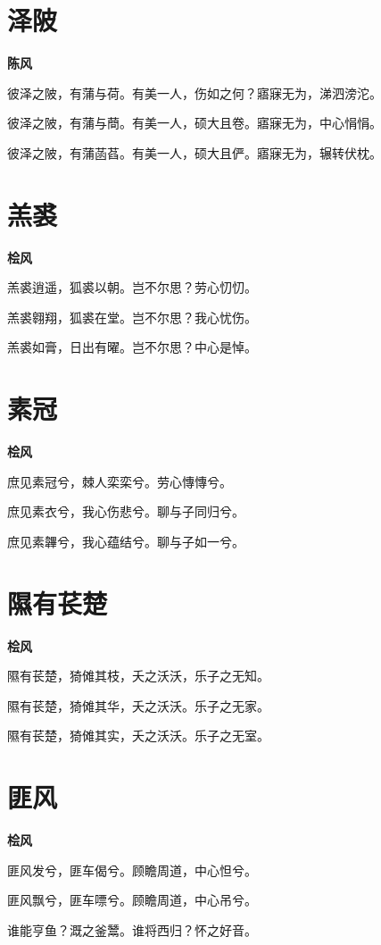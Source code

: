 \documentclass[12pt,a4paper]{ctexbook}
\begin{document}
\section{泽陂}
\textbf{陈风}\par\vspace{0.5em}
彼泽之陂，有蒲与荷。有美一人，伤如之何？寤寐无为，涕泗滂沱。\par
彼泽之陂，有蒲与蕳。有美一人，硕大且卷。寤寐无为，中心悁悁。\par
彼泽之陂，有蒲菡萏。有美一人，硕大且俨。寤寐无为，辗转伏枕。\par

\section{羔裘}
\textbf{桧风}\par\vspace{0.5em}
羔裘逍遥，狐裘以朝。岂不尔思？劳心忉忉。\par
羔裘翱翔，狐裘在堂。岂不尔思？我心忧伤。\par
羔裘如膏，日出有曜。岂不尔思？中心是悼。\par

\section{素冠}
\textbf{桧风}\par\vspace{0.5em}
庶见素冠兮，棘人栾栾兮。劳心慱慱兮。\par
庶见素衣兮，我心伤悲兮。聊与子同归兮。\par
庶见素韠兮，我心蕴结兮。聊与子如一兮。\par

\section{隰有苌楚}
\textbf{桧风}\par\vspace{0.5em}
隰有苌楚，猗傩其枝，夭之沃沃，乐子之无知。\par
隰有苌楚，猗傩其华，夭之沃沃。乐子之无家。\par
隰有苌楚，猗傩其实，夭之沃沃。乐子之无室。\par

\section{匪风}
\textbf{桧风}\par\vspace{0.5em}
匪风发兮，匪车偈兮。顾瞻周道，中心怛兮。\par
匪风飘兮，匪车嘌兮。顾瞻周道，中心吊兮。\par
谁能亨鱼？溉之釜鬵。谁将西归？怀之好音。\par
\end{document}
